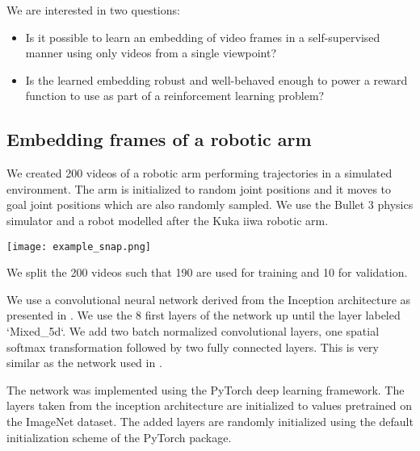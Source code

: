 
We are interested in two questions:
\begin{itemize}
\item Is it possible to learn an embedding of video frames in a self-supervised manner using only videos from a single viewpoint?
\item Is the learned embedding robust and well-behaved enough to power a reward function to use as part of a reinforcement learning problem?
\end{itemize}

\subsection{Embedding frames of a robotic arm}

We created 200 videos of a robotic arm performing trajectories in a simulated environment. The arm is initialized to random joint positions and it moves to goal joint positions which are also randomly sampled. We use the Bullet 3 physics simulator and a robot modelled after the Kuka iiwa robotic arm.

{
    \label{example-snap}
    \centering
    \texttt{[image: example\_snap.png]}
    \vspace{0.5cm}
}

We split the 200 videos such that 190 are used for training and 10 for validation.

We use a convolutional neural network derived from the Inception architecture as presented in \citep{inception-v3}. We use the 8 first layers of the network up until the layer labeled `Mixed\_5d`. We add two batch normalized convolutional layers, one spatial softmax transformation followed by two fully connected layers. This is very similar as the network used in \cite{self-supervised-learning}.

The network was implemented using the PyTorch deep learning framework. The layers taken from the inception architecture are initialized to values pretrained on the ImageNet dataset. The added layers are randomly initialized using the default initialization scheme of the PyTorch package.

